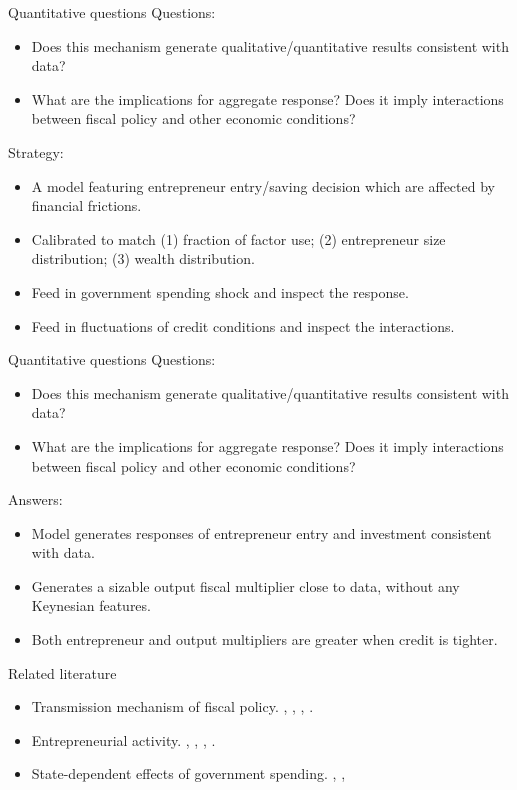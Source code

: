 \documentclass[svgnames]{beamer}
\begin{document}
\begin{frame}{Quantitative questions}
Questions:
\begin{itemize}
\item Does this mechanism generate qualitative/quantitative results consistent with data?
\item What are the implications for aggregate response? Does it imply interactions between fiscal policy and other economic conditions?
\end{itemize}
Strategy:
\begin{itemize}
\item A model featuring entrepreneur entry/saving decision which are affected by financial frictions.
\item Calibrated to match (1) fraction of factor use; (2) entrepreneur size distribution; (3) wealth distribution.
\item Feed in government spending shock and inspect the response.
\item Feed in fluctuations of credit conditions and inspect the interactions.
\end{itemize}
\end{frame}

\begin{frame}{Quantitative questions}
Questions:
\begin{itemize}
\item Does this mechanism generate qualitative/quantitative results consistent with data?
\item What are the implications for aggregate response? Does it imply interactions between fiscal policy and other economic conditions?
\end{itemize}
Answers:
\begin{itemize}
\item Model generates responses of entrepreneur entry and investment consistent with data.
\item Generates a sizable output fiscal multiplier close to data, without any Keynesian features.
\item Both entrepreneur and output multipliers are greater when credit is tighter.
\end{itemize}
\end{frame}



\begin{frame}{Related literature}
\begin{itemize}
\item {\color{blue} Transmission mechanism of fiscal policy.} \citet{hall_by_2009}, \citet{dyrda_models_2012}, \citet{heathcote_fiscal_2005}, \citet{bachmann_welfare_2013}.
\item {\color{blue} Entrepreneurial activity.} \citet{decker_role_2014}, \citet{quadrini_entrepreneurship_2000}, \citet{cagetti_entrepreneurship_2006}, \citet{buera_finance_2011}.
\item {\color{blue} State-dependent effects of government spending.} \citet{auerbach_measuring_2012}, \citet{owyang_are_2013}, \citet{fazzari_state-dependent_2015}
\end{itemize}
\end{frame}
\end{document}
